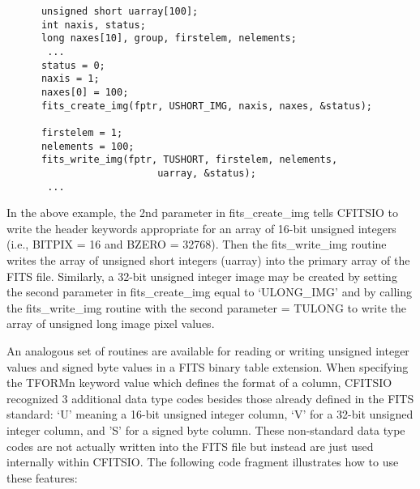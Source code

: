 \documentclass[11pt]{book}
\begin{document}
\begin{verbatim}
      unsigned short uarray[100];
      int naxis, status;
      long naxes[10], group, firstelem, nelements;
       ...
      status = 0;
      naxis = 1;
      naxes[0] = 100;
      fits_create_img(fptr, USHORT_IMG, naxis, naxes, &status);

      firstelem = 1;
      nelements = 100;
      fits_write_img(fptr, TUSHORT, firstelem, nelements,
                          uarray, &status);
       ...
\end{verbatim}
In the above example, the 2nd parameter in fits\_create\_img tells
CFITSIO to write the header keywords appropriate for an array of 16-bit
unsigned integers (i.e., BITPIX = 16 and BZERO = 32768).  Then the
fits\_write\_img routine writes the array of unsigned short integers
(uarray) into the primary array of the FITS file.  Similarly, a 32-bit
unsigned integer image may be created by setting the second parameter
in fits\_create\_img equal to `ULONG\_IMG' and by calling the
fits\_write\_img routine with the second parameter = TULONG to write
the array of unsigned long image pixel values.

An analogous set of routines are available for reading or writing unsigned
integer values and signed byte values in a FITS binary table extension.
When specifying the TFORMn keyword value which defines the format of a
column, CFITSIO recognized 3 additional data type codes besides those
already defined in the FITS standard: `U' meaning a 16-bit unsigned
integer column, `V' for a 32-bit unsigned integer column, and 'S'
for a signed byte column.  These non-standard data type codes are not
actually written into the FITS file but instead are just used internally
within CFITSIO.  The following code fragment illustrates how to use
these features:
\end{document}
